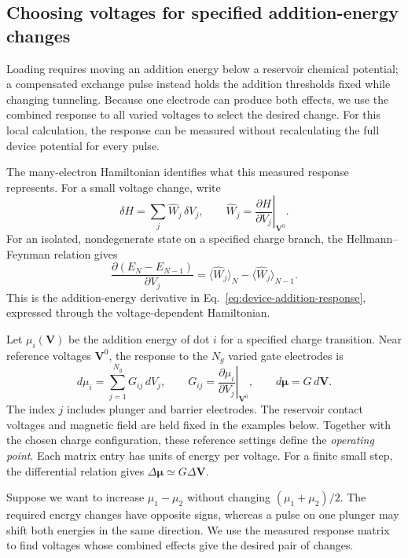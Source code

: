 \subsection{Choosing voltages for specified addition-energy changes}
\label{app:virtual-gates}
\label{sec:operating-points-virtual-gates}

Loading requires moving an addition energy below a reservoir chemical
potential; a compensated exchange pulse instead holds the addition
thresholds fixed while changing tunneling. Because one electrode can
produce both effects, we use the combined response to all varied
voltages to select the desired change. For this local calculation,
the response can be measured without recalculating the full device
potential for every pulse.

The many-electron Hamiltonian identifies what this measured
response represents.
For a small voltage change, write
\[
 \delta H=\sum_j \widehat W_j\,\delta V_j,\qquad
 \widehat W_j=\left.\frac{\partial H}{\partial V_j}\right|_{\mathbf V^0}.
\]
For an isolated, nondegenerate state on a specified charge branch,
the Hellmann--Feynman relation gives
\[
 \frac{\partial(E_N-E_{N-1})}{\partial V_j}
 =\langle\widehat W_j\rangle_N-\langle\widehat W_j\rangle_{N-1}.
\]
This is the addition-energy derivative in
Eq.~\eqref{eq:device-addition-response}, expressed through the
voltage-dependent Hamiltonian.

Let $\mu_i(\mathbf V)$ be the addition energy of dot $i$ for a
specified charge transition. Near reference voltages $\mathbf V^0$,
the response to the $N_g$ varied gate electrodes is
\begin{equation}
 d\mu_i=\sum_{j=1}^{N_g}G_{ij}\,dV_j,\qquad
 G_{ij}=\left.\frac{\partial\mu_i}{\partial V_j}\right|_{\mathbf V^0},
 \qquad d\boldsymbol\mu=G\,d\mathbf V.
 \label{eq:calibration-response-matrix}
\end{equation}
The index $j$ includes plunger and barrier electrodes.
The reservoir contact voltages and magnetic field are held fixed
in the examples below. Together with the chosen charge
configuration, these reference settings define the
\emph{operating point}. Each matrix entry has units of energy
per voltage. For a finite small step, the differential relation
gives $\Delta\boldsymbol\mu\simeq G\Delta\mathbf V$.

Suppose we want to increase $\mu_1-\mu_2$ without changing
$(\mu_1+\mu_2)/2$. The required energy changes have opposite signs,
whereas a pulse on one plunger may shift both energies in the
same direction. We use the measured response matrix to find
voltages whose combined effects give the desired pair of changes.

